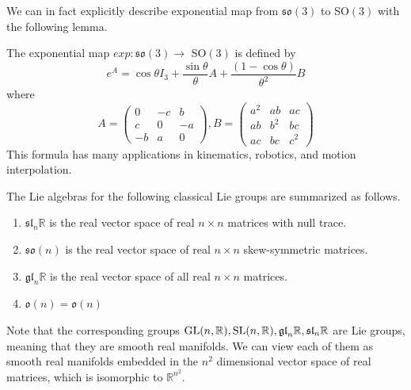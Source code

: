     We can in fact explicitly describe exponential map from $\mathfrak{so}(3)$ to SO$(3)$ with the following lemma. 

    \begin{lemma}
      The exponential map $exp: \mathfrak{so}(3) \longrightarrow$ SO$(3)$ is defined by 
      \begin{equation}
        e^A = \cos{\theta} I_3 + \frac{\sin{\theta}}{\theta} A + \frac{(1 - \cos{\theta})}{\theta^2} B
      \end{equation}
      where 
      \begin{equation}
        A = \begin{pmatrix}
        0&-c&b\\c&0&-a\\-b&a&0
        \end{pmatrix}, B = \begin{pmatrix}
        a^2&ab&ac\\ab&b^2&bc\\ac&bc&c^2
        \end{pmatrix}
      \end{equation}
      This formula has many applications in kinematics, robotics, and motion interpolation. 
    \end{lemma}

    \begin{theorem}
    The Lie algebras for the following classical Lie groups are summarized as follows. 
    \begin{enumerate}
      \item $\mathfrak{sl}_n \mathbb{R}$ is the real vector space of real $n \times n$ matrices with null trace.
      \item $\mathfrak{so}(n)$ is the real vector space of real $n \times n$ skew-symmetric matrices. 
      \item $\mathfrak{gl}_n \mathbb{R}$ is the real vector space of all real $n \times n$ matrices.
      \item $\mathfrak{o}(n) = \mathfrak{o}(n)$
    \end{enumerate}
    \end{theorem}
    Note that the corresponding groups $\operatorname{GL}(n, \mathbb{R}), \operatorname{SL}(n, \mathbb{R}), \mathfrak{gl}_n \mathbb{R}, \mathfrak{sl}_n \mathbb{R}$ are Lie groups, meaning that they are smooth real manifolds. We can view each of them as smooth real manifolds embedded in the $n^2$ dimensional vector space of real matrices, which is isomorphic to $\mathbb{R}^{n^2}$. 

